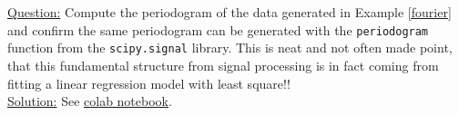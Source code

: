 \begin{example}[Periodogram]\label{ex:period}
\noindent
\underline{Question:} Compute the periodogram of the data generated in Example \ref{fourier} and confirm the same periodogram can be generated with the \verb!periodogram!  function from the \verb!scipy.signal! library. This is neat and not often made point, that this fundamental structure from signal processing is in fact coming from fitting a linear regression model with least square!! \\

\noindent
\underline{Solution:} See \href{https://colab.research.google.com/drive/1EYcMviowfsnsVe7vsUKlyzkNsddUiTau?usp=sharing}{colab notebook}. \\

\end{example}







\newpage
